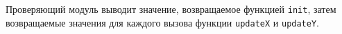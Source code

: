 Проверяющий модуль выводит значение, возвращаемое функцией \texttt{init}, затем возвращаемые
значения для каждого вызова функции \texttt{updateX} и \texttt{updateY}.
